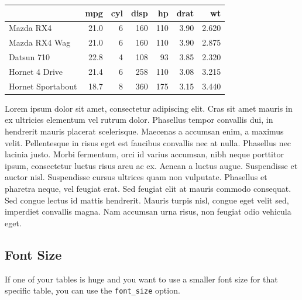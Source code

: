 \documentclass[table]{article}
\newenvironment{Shaded}{\begin{snugshade}}{\end{snugshade}}
\newcommand{\DataTypeTok}[1]{\textcolor[rgb]{0.13,0.29,0.53}{#1}}
\newcommand{\KeywordTok}[1]{\textcolor[rgb]{0.13,0.29,0.53}{\textbf{#1}}}
\newcommand{\NormalTok}[1]{#1}
\newcommand{\OperatorTok}[1]{\textcolor[rgb]{0.81,0.36,0.00}{\textbf{#1}}}
\newcommand{\StringTok}[1]{\textcolor[rgb]{0.31,0.60,0.02}{#1}}
\begin{document}
\begin{Shaded}
\end{Shaded}

\begin{table}
\begin{tabular}{lrrrrrr}
\toprule
  & mpg & cyl & disp & hp & drat & wt\\
\midrule
Mazda RX4 & 21.0 & 6 & 160 & 110 & 3.90 & 2.620\\
Mazda RX4 Wag & 21.0 & 6 & 160 & 110 & 3.90 & 2.875\\
Datsun 710 & 22.8 & 4 & 108 & 93 & 3.85 & 2.320\\
Hornet 4 Drive & 21.4 & 6 & 258 & 110 & 3.08 & 3.215\\
Hornet Sportabout & 18.7 & 8 & 360 & 175 & 3.15 & 3.440\\
\bottomrule
\end{tabular}\end{table}

Lorem ipsum dolor sit amet, consectetur adipiscing elit. Cras sit amet
mauris in ex ultricies elementum vel rutrum dolor. Phasellus tempor
convallis dui, in hendrerit mauris placerat scelerisque. Maecenas a
accumsan enim, a maximus velit. Pellentesque in risus eget est faucibus
convallis nec at nulla. Phasellus nec lacinia justo. Morbi fermentum,
orci id varius accumsan, nibh neque porttitor ipsum, consectetur luctus
risus arcu ac ex. Aenean a luctus augue. Suspendisse et auctor nisl.
Suspendisse cursus ultrices quam non vulputate. Phasellus et pharetra
neque, vel feugiat erat. Sed feugiat elit at mauris commodo consequat.
Sed congue lectus id mattis hendrerit. Mauris turpis nisl, congue eget
velit sed, imperdiet convallis magna. Nam accumsan urna risus, non
feugiat odio vehicula eget.

\hypertarget{font-size}{%
\subsection{Font Size}\label{font-size}}

If one of your tables is huge and you want to use a smaller font size
for that specific table, you can use the \texttt{font\_size} option.
\end{document}
